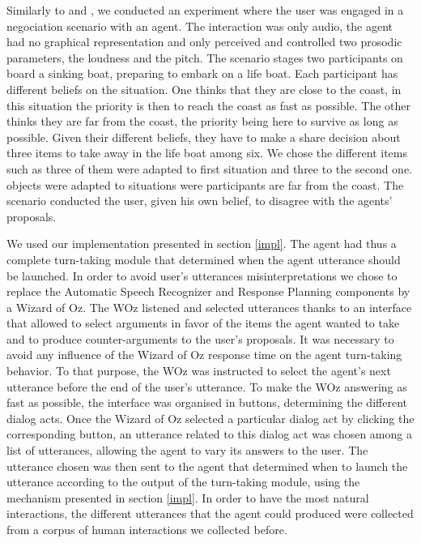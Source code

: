 Similarly to \cite{de_vault_toward_2015} and \citep{skantze_towards_2010}, we conducted an experiment where the user was engaged in a negociation scenario with an agent. The interaction was only audio, the agent had no graphical representation and only perceived and controlled two prosodic parameters, the loudness and the pitch. 
The scenario stages two participants on board a sinking boat, preparing to embark on a life boat. 
Each participant has different beliefs on the situation. 
One thinks that they are close to the coast, in this situation the priority is then to reach the coast as fast as possible. 
The other thinks they are far from the coast, the priority being here to survive as long as possible. 
Given their different beliefs, they have to make a share decision about three items to take away in the life boat among six. We chose the different items such as three of them were adapted to first situation 
and three to the second one.
objects were adapted to situations were participants are far from the coast. 
The scenario conducted the user, given his own belief, to disagree with the agents' proposals.   

We used our implementation presented in section \ref{impl}. The agent had thus a complete turn-taking module that determined when the agent utterance should be launched. In order to avoid user's utterances misinterpretations we chose to replace the Automatic Speech Recognizer and Response Planning components by a Wizard of Oz. The WOz listened and selected utterances thanks to an interface that allowed to select arguments in favor of the items the agent wanted to take and to produce counter-arguments to the user's proposals. It was necessary to avoid any influence of the Wizard of Oz response time on the agent turn-taking behavior. To that purpose, the WOz was instructed to select the agent's next utterance before the end of the user's utterance. 
To make the WOz answering as fast as possible, the interface was organised in buttons, determining the different dialog acts. Once the Wizard of Oz selected a particular dialog act by clicking the corresponding button, an utterance related to this dialog act was chosen among a list of utterances, allowing the agent to vary its answers to the user. The utterance chosen was then sent to the agent that determined when to launch the utterance according to the output of the turn-taking module, using the mechanism presented in section \ref{impl}. In order to have the most natural interactions, the different utterances that the agent could produced were collected from a corpus of human interactions we collected before. 

